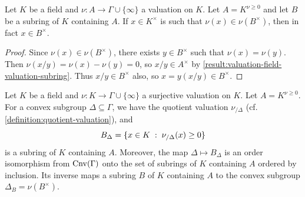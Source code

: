 \begin{lemma}
\label{result:image-of-group-of-units-of-overring}
Let $K$ be a field and $\nu : A \to \Gamma \cup \{\infty\}$ a valuation on $K$. Let $A = K^{\nu \geq 0}$ and let $B$ be a subring of $K$ containing $A$. If $x \in K^\times$ is such that $\nu(x) \in \nu(B^\times)$, then in fact $x \in B^\times$. 
\end{lemma}

\begin{proof}
Since $\nu(x) \in \nu(B^\times)$, there exists $y \in B^\times$ such that $\nu(x) = \nu(y)$. Then $\nu(x/y) = \nu(x) - \nu(y) = 0$, so $x/y \in A^\times$ by \cref{result:valuation-field-valuation-subring}. Thus $x/y \in B^\times$ also, so $x = y(x/y) \in B^\times$. 
\end{proof}

\begin{lemma}
\label{result:convex-subgroups-and-overrings}
Let $K$ be a field and $\nu : K \to \Gamma \cup \{\infty\}$ a surjective valuation on $K$. Let $A = K^{\nu \geq 0}$. For a convex subgroup $\Delta \subseteq \Gamma$, we have the quotient valuation $\nu_{/\Delta}$ (cf. \cref{definition:quotient-valuation}), and 
\[ B_\Delta = \{ x \in K \; : \; \nu_{/\Delta}(x) \geq 0 \} \]
is a subring of $K$ containing $A$. Moreover, the map $\Delta \mapsto B_\Delta$ is an order isomorphism from $\operatorname{Cnv}(\Gamma)$ onto the set of subrings of $K$ containing $A$ ordered by inclusion. Its inverse maps a subring $B$ of $K$ containing $A$ to the convex subgroup $\Delta_B = \nu(B^\times)$. 
\end{lemma}

